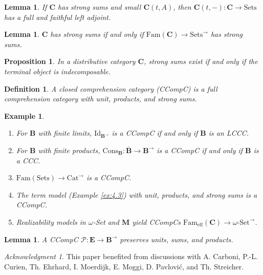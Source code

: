 \documentclass{article}
\theoremstyle{plain}
\newtheorem{lemma}[theorem]{Lemma}
\newtheorem{proposition}[theorem]{Proposition}
\newtheorem{definition}[theorem]{Definition}
\newtheorem{example}[theorem]{Example}
\theoremstyle{remark}
\newtheorem*{acknowledgment}{Acknowledgment}
\begin{document}
\begin{lemma}
\label{lem:5.10}
If $\mathbf{C}$ has strong sums and small $\mathbf{C}(t, A)$, then $\mathbf{C}(t, -) : \mathbf{C} \to \text{Sets}$ has a full and faithful left adjoint.
\end{lemma}

\begin{lemma}
\label{lem:5.11}
$\mathbf{C}$ has strong sums if and only if $\text{Fam}(\mathbf{C}) \to \text{Sets}^{\to}$ has strong sums.
\end{lemma}

\begin{proposition}
\label{prop:5.12}
In a distributive category $\mathbf{C}$, strong sums exist if and only if the terminal object is indecomposable.
\end{proposition}

\begin{definition}
\label{def:5.13}
A \emph{closed comprehension category} (CCompC) is a full comprehension category with unit, products, and strong sums.
\end{definition}

\begin{example}
\label{ex:5.14}
\begin{enumerate}
    \item[(i)] For $\mathbf{B}$ with finite limits, $\text{Id}_{\mathbf{B}^{\to}}$ is a CCompC if and only if $\mathbf{B}$ is an LCCC.
    \item[(ii)] For $\mathbf{B}$ with finite products, $\text{Cons}_{\mathbf{B}} : \overline{\mathbf{B}} \to \mathbf{B}^{\to}$ is a CCompC if and only if $\mathbf{B}$ is a CCC.
    \item[(iii)] $\text{Fam}(\text{Sets}) \to \text{Cat}^{\to}$ is a CCompC.
    \item[(iv)] The term model (Example \ref{ex:4.3}) with unit, products, and strong sums is a CCompC.
    \item[(v)] Realizability models in $\omega$-Set and $\mathbf{M}$ yield CCompCs $\text{Fam}_{\text{eff}}(\mathbf{C}) \to \omega\text{-Set}^{\to}$.
\end{enumerate}
\end{example}

\begin{lemma}
\label{lem:5.15}
A CCompC $\mathscr{P} : \mathbf{E} \to \mathbf{B}^{\to}$ preserves units, sums, and products.
\end{lemma}

\begin{acknowledgment}
This paper benefited from discussions with A. Carboni, P.-L. Curien, Th. Ehrhard, I. Moerdijk, E. Moggi, D. Pavlović, and Th. Streicher.
\end{acknowledgment}
\end{document}
